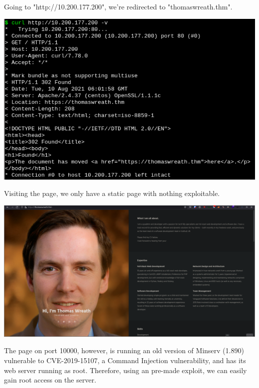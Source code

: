 \newpage

Going to "http://10.200.177.200", we're redirected to "thomaswreath.thm".

\includegraphics[width=\textwidth]{img/home-redirect.png}

Visiting the page, we only have a static page with nothing exploitable.

\includegraphics[width=\textwidth]{img/home.png}

The page on port 10000, however, is running an old version of Minserv (1.890) vulnerable to CVE-2019-15107, a Command Injection vulnerability, and has its web server running as root. Therefore, using an pre-made exploit, we can easily gain root access on the server.

